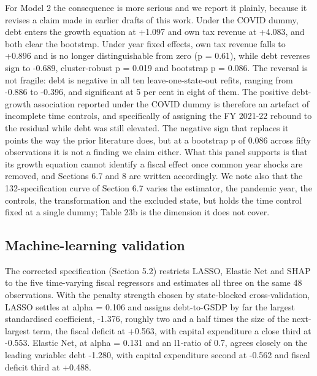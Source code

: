 \documentclass[12pt,a4paper]{article}
\begin{document}
For Model 2 the consequence is more serious and we report it plainly, because it revises a claim made in earlier drafts of this work. Under the COVID dummy, debt enters the growth equation at +1.097 and own tax revenue at +4.083, and both clear the bootstrap. Under year fixed effects, own tax revenue falls to +0.896 and is no longer distinguishable from zero (p = 0.61), while debt reverses sign to -0.689, cluster-robust p = 0.019 and bootstrap p = 0.086. The reversal is not fragile: debt is negative in all ten leave-one-state-out refits, ranging from -0.886 to -0.396, and significant at 5 per cent in eight of them. The positive debt-growth association reported under the COVID dummy is therefore an artefact of incomplete time controls, and specifically of assigning the FY 2021-22 rebound to the residual while debt was still elevated. The negative sign that replaces it points the way the prior literature does, but at a bootstrap p of 0.086 across fifty observations it is not a finding we claim either. What this panel supports is that its growth equation cannot identify a fiscal effect once common year shocks are removed, and Sections 6.7 and 8 are written accordingly. We note also that the 132-specification curve of Section 6.7 varies the estimator, the pandemic year, the controls, the transformation and the excluded state, but holds the time control fixed at a single dummy; Table 23b is the dimension it does not cover.

\subsection{Machine-learning validation}

The corrected specification (Section 5.2) restricts LASSO, Elastic Net and SHAP to the five time-varying fiscal regressors and estimates all three on the same 48 observations. With the penalty strength chosen by state-blocked cross-validation, LASSO settles at alpha = 0.106 and assigns debt-to-GSDP by far the largest standardised coefficient, -1.376, roughly two and a half times the size of the next-largest term, the fiscal deficit at +0.563, with capital expenditure a close third at -0.553. Elastic Net, at alpha = 0.131 and an l1-ratio of 0.7, agrees closely on the leading variable: debt -1.280, with capital expenditure second at -0.562 and fiscal deficit third at +0.488.
\end{document}
